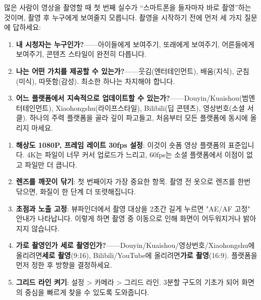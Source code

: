 


많은 사람이 영상을 촬영할 때 첫 번째 실수가 “스마트폰을 들자마자 바로 촬영”하는 것이며, 촬영 후 누구에게 보여줄지 모릅니다. 촬영을 시작하기 전에 먼저 세 가지 질문에 답하세요:

\begin{enumerate}
  \item \textbf{내 시청자는 누구인가?}——아이들에게 보여주기, 또래에게 보여주기, 어른들에게 보여주기, 콘텐츠 스타일이 완전히 다릅니다.
  \item \textbf{나는 어떤 가치를 제공할 수 있는가?}——웃김(엔터테인먼트), 배움(지식), 군침(미식), 따뜻함(감성). 최소한 하나는 차지해야 합니다.
  \item \textbf{어느 플랫폼에서 지속적으로 업데이트할 수 있는가?}——Douyin/Kuaishou(범엔터테인먼트), Xiaohongshu(라이프스타일), Bilibili(딥 콘텐츠), 영상번호(소셜 서클). 하나의 주력 플랫폼을 골라 깊이 파고들고, 처음부터 모든 플랫폼에 동시에 올리지 마세요.
\end{enumerate}


\begin{enumerate}
  \item \textbf{해상도 1080P, 프레임 레이트 30fps 설정}: 이것이 숏폼 영상 플랫폼의 표준입니다. 4K는 파일이 너무 커서 업로드가 느리고, 60fps는 소셜 플랫폼에서 이점이 없고 파일만 더 큽니다.
  \item \textbf{렌즈를 깨끗이 닦기}: 첫 번째이자 가장 중요한 항목. 촬영 전 옷으로 렌즈를 한번 닦으면, 화질이 한 단계 더 또렷해집니다.
  \item \textbf{초점과 노출 고정}: 뷰파인더에서 촬영 대상을 2초간 길게 누르면 "AE/AF 고정" 안내가 나타납니다. 이렇게 하면 촬영 중 이동으로 인해 화면이 어두워지거나 밝아지지 않습니다.
  \item \textbf{가로 촬영인가 세로 촬영인가?}——Douyin/Kuaishou/영상번호/Xiaohongshu에 올리려면\textbf{세로 촬영}(9:16), Bilibili/YouTube에 올리려면\textbf{가로 촬영}(16:9). 플랫폼을 먼저 정한 후 방향을 결정하세요.
  \item \textbf{그리드 라인 켜기}: 설정 > 카메라 > 그리드 라인. 3분할 구도의 기초가 되어 화면의 중심을 빠르게 찾을 수 있도록 도와줍니다.
\end{enumerate}

